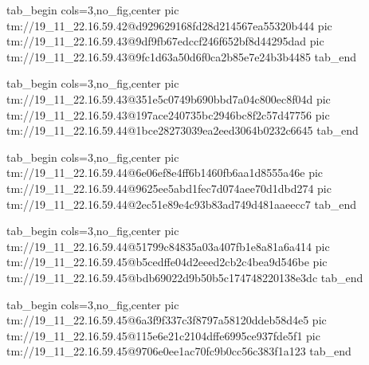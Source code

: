  
 
 
 
 

\qqSecOrig


\ifcmt
  tab_begin cols=3,no_fig,center
    pic tm://19_11_22.16.59.42@d929629168fd28d214567ea55320b444
    pic tm://19_11_22.16.59.43@9df9fb67edccf246f652bf8d44295dad
    pic tm://19_11_22.16.59.43@9fc1d63a50d6f0ca2b85e7e24b3b4485
  tab_end
\fi


\ifcmt
  tab_begin cols=3,no_fig,center
    pic tm://19_11_22.16.59.43@351e5c0749b690bbd7a04c800ec8f04d
    pic tm://19_11_22.16.59.43@197ace240735bc2946bc8f2c57d47756
    pic tm://19_11_22.16.59.44@1bce28273039ea2eed3064b0232c6645
  tab_end
\fi


\ifcmt
  tab_begin cols=3,no_fig,center
    pic tm://19_11_22.16.59.44@6e06ef8e4ff6b1460fb6aa1d8555a46e
    pic tm://19_11_22.16.59.44@9625ee5abd1fec7d074aee70d1dbd274
    pic tm://19_11_22.16.59.44@2ec51e89e4c93b83ad749d481aaeecc7
  tab_end
\fi


\ifcmt
  tab_begin cols=3,no_fig,center
    pic tm://19_11_22.16.59.44@51799c84835a03a407fb1e8a81a6a414
    pic tm://19_11_22.16.59.45@b5cedffe04d2eeed2cb2c4bea9d546be
    pic tm://19_11_22.16.59.45@bdb69022d9b50b5c174748220138e3dc
  tab_end
\fi


\ifcmt
  tab_begin cols=3,no_fig,center
    pic tm://19_11_22.16.59.45@6a3f9f337c3f8797a58120ddeb58d4e5
    pic tm://19_11_22.16.59.45@115e6e21c2104dffe6995ce937fde5f1
    pic tm://19_11_22.16.59.45@9706e0ee1ac70fc9b0cc56c383f1a123
  tab_end
\fi

